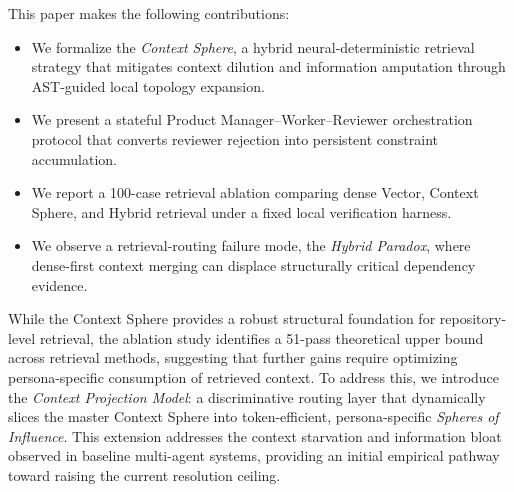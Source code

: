 This paper makes the following contributions:
\begin{itemize}
    \item We formalize the \textit{Context Sphere}, a hybrid neural-deterministic retrieval strategy that mitigates context dilution and information amputation through AST-guided local topology expansion.
    \item We present a stateful Product Manager--Worker--Reviewer orchestration protocol that converts reviewer rejection into persistent constraint accumulation.
    \item We report a 100-case retrieval ablation comparing dense Vector, Context Sphere, and Hybrid retrieval under a fixed local verification harness.
    \item We observe a retrieval-routing failure mode, the \textit{Hybrid Paradox}, where dense-first context merging can displace structurally critical dependency evidence.
\end{itemize}

While the Context Sphere provides a robust structural foundation for repository-level retrieval, the ablation study identifies a 51-pass theoretical upper bound across retrieval methods, suggesting that further gains require optimizing persona-specific consumption of retrieved context. To address this, we introduce the \textit{Context Projection Model}: a discriminative routing layer that dynamically slices the master Context Sphere into token-efficient, persona-specific \textit{Spheres of Influence}. This extension addresses the context starvation and information bloat observed in baseline multi-agent systems, providing an initial empirical pathway toward raising the current resolution ceiling.
